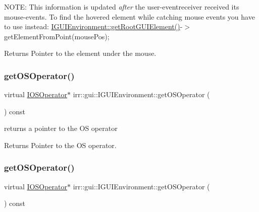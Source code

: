N\+O\+TE\+: This information is updated {\itshape after} the user-\/eventreceiver received it\textquotesingle{}s mouse-\/events. To find the hovered element while catching mouse events you have to use instead\+: \hyperlink{classirr_1_1gui_1_1IGUIEnvironment_a35fec6d5baa9b2f65aa9ee2c336104d4}{I\+G\+U\+I\+Environment\+::get\+Root\+G\+U\+I\+Element()}-\/$>$get\+Element\+From\+Point(mouse\+Pos); \begin{DoxyReturn}{Returns}
Pointer to the element under the mouse. 
\end{DoxyReturn}
\mbox{\label{classirr_1_1gui_1_1IGUIEnvironment_afc715b9a9d98ae3aa8e769c9fb2f4f31}} 
\subsubsection{\texorpdfstring{get\+O\+S\+Operator()}{getOSOperator()}\hspace{0.1cm}{\footnotesize\ttfamily [1/2]}}
{\footnotesize\ttfamily virtual \hyperlink{classirr_1_1IOSOperator}{I\+O\+S\+Operator}$\ast$ irr\+::gui\+::\+I\+G\+U\+I\+Environment\+::get\+O\+S\+Operator (\begin{DoxyParamCaption}{ }\end{DoxyParamCaption}) const\hspace{0.3cm}{\ttfamily [pure virtual]}}



returns a pointer to the OS operator 

\begin{DoxyReturn}{Returns}
Pointer to the OS operator. 
\end{DoxyReturn}
\mbox{\label{classirr_1_1gui_1_1IGUIEnvironment_afc715b9a9d98ae3aa8e769c9fb2f4f31}} 
\subsubsection{\texorpdfstring{get\+O\+S\+Operator()}{getOSOperator()}\hspace{0.1cm}{\footnotesize\ttfamily [2/2]}}
{\footnotesize\ttfamily virtual \hyperlink{classirr_1_1IOSOperator}{I\+O\+S\+Operator}$\ast$ irr\+::gui\+::\+I\+G\+U\+I\+Environment\+::get\+O\+S\+Operator (\begin{DoxyParamCaption}{ }\end{DoxyParamCaption}) const\hspace{0.3cm}{\ttfamily [pure virtual]}}



